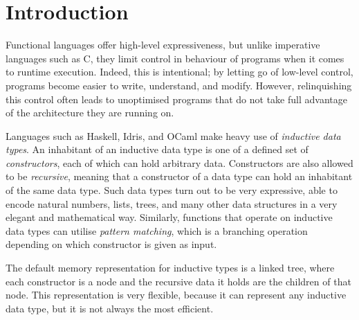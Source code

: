 \section{Introduction}\label{sec:intro}

Functional languages offer high-level expressiveness, but unlike imperative
languages such as C, they limit control in behaviour of programs when it comes
to runtime execution. Indeed, this is intentional; by letting go of low-level
control, programs become easier to write, understand, and modify. However,
relinquishing this control often leads to unoptimised programs that do not take
full advantage of the architecture they are running on.

Languages such as Haskell, Idris, and OCaml make heavy use of \emph{inductive
  data types}. An inhabitant of an inductive data type is one of a defined set of
\emph{constructors}, each of which can hold arbitrary data. Constructors are
also allowed to be \emph{recursive}, meaning that a constructor of a data type
can hold an inhabitant of the same data type. Such data types turn out to be
very expressive, able to encode natural numbers, lists, trees, and many other
data structures in a very elegant and mathematical way. Similarly, functions
that operate on inductive data types can utilise \emph{pattern matching}, which
is a branching operation depending on which constructor is given as input.

The default memory representation for inductive types is a linked tree, where
each constructor is a node and the recursive data it holds are the children of
that node. This representation is very flexible, because it can represent any
inductive data type, but it is not always the most efficient.


